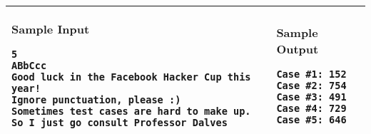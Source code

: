 \begin{table}[!h]
\centering
\begin{tabular}{|l|l|}
\hline
\begin{minipage}[t]{4.2in}
\textbf{Sample Input}
\begin{verbatim}
5
ABbCcc
Good luck in the Facebook Hacker Cup this year!
Ignore punctuation, please :)
Sometimes test cases are hard to make up.
So I just go consult Professor Dalves
\end{verbatim}
\vspace{1mm}
\end{minipage}
&

\begin{minipage}[t]{1.8in}
\textbf{Sample Output}
\begin{verbatim}
Case #1: 152
Case #2: 754
Case #3: 491
Case #4: 729
Case #5: 646
\end{verbatim}
\vspace{1mm}
\end{minipage} \\
\hline
\end{tabular}
\end{table}

\newpage
